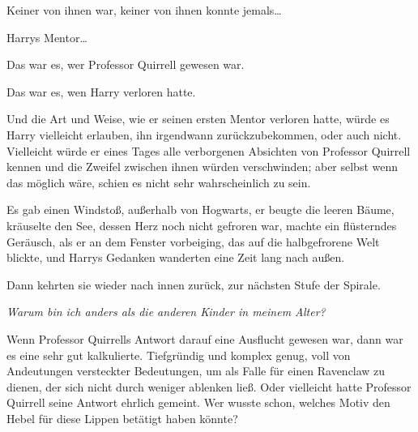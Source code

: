 Keiner von ihnen war, keiner von ihnen konnte jemals…

Harrys Mentor…

Das war es, wer Professor Quirrell gewesen war.

Das war es, wen Harry verloren hatte.

Und die Art und Weise, wie er seinen ersten Mentor verloren hatte, würde es Harry vielleicht erlauben, ihn irgendwann zurückzubekommen, oder auch nicht. Vielleicht würde er eines Tages alle verborgenen Absichten von Professor Quirrell kennen und die Zweifel zwischen ihnen würden verschwinden; aber selbst wenn das möglich wäre, schien es nicht sehr wahrscheinlich zu sein.

Es gab einen Windstoß, außerhalb von Hogwarts, er beugte die leeren Bäume, kräuselte den See, dessen Herz noch nicht gefroren war, machte ein flüsterndes Geräusch, als er an dem Fenster vorbeiging, das auf die halbgefrorene Welt blickte, und Harrys Gedanken wanderten eine Zeit lang nach außen.

Dann kehrten sie wieder nach innen zurück, zur nächsten Stufe der Spirale.

\emph{Warum bin ich anders als die anderen Kinder in meinem Alter?}

Wenn Professor Quirrells Antwort darauf eine Ausflucht gewesen war, dann war es eine sehr gut kalkulierte. Tiefgründig und komplex genug, voll von Andeutungen versteckter Bedeutungen, um als Falle für einen Ravenclaw zu dienen, der sich nicht durch weniger ablenken ließ. Oder vielleicht hatte Professor Quirrell seine Antwort ehrlich gemeint. Wer wusste schon, welches Motiv den Hebel für diese Lippen betätigt haben könnte?


